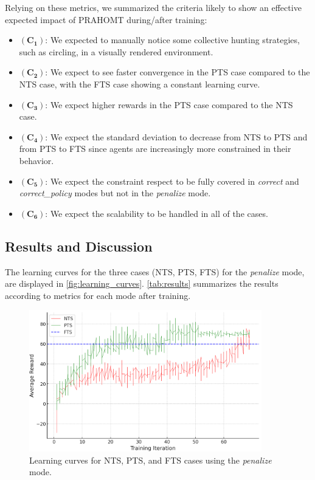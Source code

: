 \documentclass[sigconf,anonymous]{aamas}
\begin{document}
Relying on these metrics, we summarized the criteria likely to show an effective expected impact of PRAHOMT during/after training:
\begin{itemize}
  \item $(\mathbf{C_1})$: We expected to manually notice some collective hunting strategies, such as circling, in a visually rendered environment.
  \item $(\mathbf{C_2})$: We expect to see faster convergence in the PTS case compared to the NTS case, with the FTS case showing a constant learning curve.
  \item $(\mathbf{C_3})$: We expect higher rewards in the PTS case compared to the NTS case.
  \item $(\mathbf{C_4})$: We expect the standard deviation to decrease from NTS to PTS and from PTS to FTS since agents are increasingly more constrained in their behavior.
  \item $(\mathbf{C_5})$: We expect the constraint respect to be fully covered in \textit{correct} and \textit{correct\_policy} modes but not in the \textit{penalize} mode.
  \item $(\mathbf{C_6})$: We expect the scalability to be handled in all of the cases.
\end{itemize}


\subsection{Results and Discussion}

The learning curves for the three cases (NTS, PTS, FTS) for the \textit{penalize} mode, are displayed in \autoref{fig:learning_curves}. \autoref{tab:results} summarizes the results according to metrics for each mode after training.

\begin{figure}[h!]
  \centering
  \includegraphics[width=0.9\textwidth]{figures/penalize_learning_curves.png}
  \caption{Learning curves for NTS, PTS, and FTS cases using the \textit{penalize} mode.}
  \label{fig:learning_curves}
\end{figure}
\end{document}
